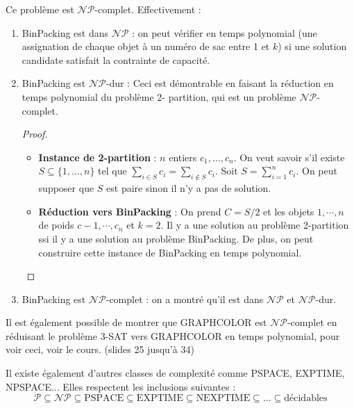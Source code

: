Ce problème est $\mathcal{NP}$-complet. Effectivement :
\begin{enumerate}
    \item BinPacking est dans $\mathcal{NP}$ : on peut vérifier en temps polynomial (une assignation de chaque objet à un numéro
    de sac entre 1 et $k$) si une solution candidate satisfait la contrainte de capacité.
    \item BinPacking est $\mathcal{NP}$-dur : Ceci est démontrable en faisant la réduction en temps polynomial du problème 2-
    partition, qui est un problème $\mathcal{NP}$-complet.
    \begin{proof}
        \begin{itemize}[label=$\rightarrow$]
            \item \textbf{Instance de 2-partition} : $n$ entiers $c_1,...,c_n$. On veut savoir s'il existe $S\subseteq\{1,...,n\}$
            tel que $\sum_{i\in S}c_i = \sum_{i\notin S}c_i$. Soit $S = \sum_{i=1}^{n}c_i$. On peut supposer que $S$ est paire sinon
            il n'y a pas de solution.
            \item \textbf{Réduction vers BinPacking} : On prend $C = S/2$ et les objets $1,\cdots,n$ de poids $c-1,\cdots,c_n$ et 
            $k=2$. Il y a une solution au problème 2-partition ssi il y a une solution au problème BinPacking. De plus, on peut 
            construire cette instance de BinPacking en temps polynomial. 
        \end{itemize}
    \end{proof}
    \item BinPacking est $\mathcal{NP}$-complet : on a montré qu'il est dans $\mathcal{NP}$ et $\mathcal{NP}$-dur.
\end{enumerate}
Il est également possible de montrer que GRAPHCOLOR est $\mathcal{NP}$-complet en réduisant le problème 3-SAT vers GRAPHCOLOR
en temps polynomial, pour voir ceci, voir le cours. (slides 25 jusqu'à 34)\\
\begin{remark}
    Il existe également d'autres classes de complexité comme PSPACE, EXPTIME, NPSPACE...
    Elles respectent les inclusions suivantes :
    \begin{equation*}
        \mathcal{P}\subseteq\mathcal{NP}\subseteq\text{PSPACE}\subseteq\text{EXPTIME}\subseteq\text{NEXPTIME}\subseteq\dots
        \subseteq \text{décidables}
    \end{equation*}
\end{remark}


